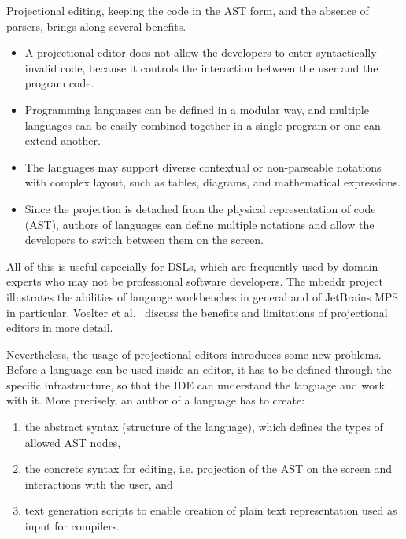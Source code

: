 Projectional editing, keeping the code in the AST form, and the absence of parsers, brings along several benefits.
\begin{itemize}
	\item A projectional editor does not allow the developers to enter syntactically invalid code, because it controls the interaction between the user and the program code.
	\item Programming languages can be defined in a modular way, and multiple languages can be easily combined together in a single program or one can extend another.
	\item The languages may support diverse contextual or non-parseable notations with complex layout, such as tables, diagrams, and mathematical expressions.
	\item Since the projection is detached from the physical representation of code (AST), authors of languages can define multiple notations and allow the developers to switch between them on the screen.
\end{itemize}
All of this is useful especially for DSLs, which are frequently used by domain experts who may not be professional software developers.
The mbeddr project~\cite{ref:MBEDDR} illustrates the abilities of language workbenches in general and of JetBrains MPS in particular.
Voelter et al.~\cite{ref:VSB14} discuss the benefits and limitations of projectional editors in more detail.

Nevertheless, the usage of projectional editors introduces some new problems.
Before a language can be used inside an editor, it has to be defined through the specific infrastructure, so that the IDE can understand the language and work with it.
More precisely, an author of a language has to create:
\begin{enumerate}
	\item the abstract syntax (structure of the language), which defines the types of allowed AST nodes,
	\item the concrete syntax for editing, i.e. projection of the AST on the screen and interactions with the user, and
	\item text generation scripts to enable creation of plain text representation used as input for compilers.
\end{enumerate}	


